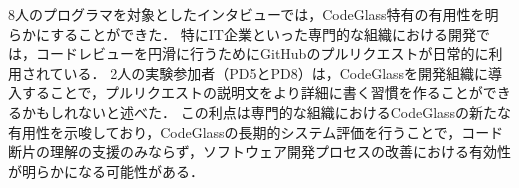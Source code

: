 

8人のプログラマを対象としたインタビューでは，CodeGlass特有の有用性を明らかにすることができた．
特にIT企業といった専門的な組織における開発では，コードレビューを円滑に行うためにGitHubのプルリクエストが日常的に利用されている．
2人の実験参加者（PD5とPD8）は，CodeGlassを開発組織に導入することで，プルリクエストの説明文をより詳細に書く習慣を作ることができるかもしれないと述べた．
この利点は専門的な組織におけるCodeGlassの新たな有用性を示唆しており，CodeGlassの長期的システム評価を行うことで，コード断片の理解の支援のみならず，ソフトウェア開発プロセスの改善における有効性が明らかになる可能性がある．


